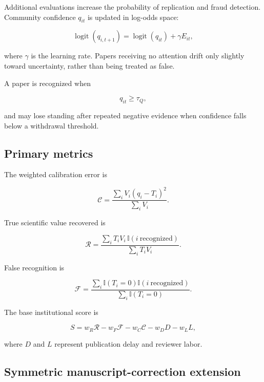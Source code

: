 Additional evaluations increase the probability of replication and fraud detection. Community confidence $q_{it}$ is updated in log-odds space:

\begin{equation}
\operatorname{logit}(q_{i,t+1})
=
\operatorname{logit}(q_{it})+\gamma E_{it},
\end{equation}

where $\gamma$ is the learning rate. Papers receiving no attention drift only slightly toward uncertainty, rather than being treated as false.

A paper is recognized when

\begin{equation}
q_{it}\geq \tau_Q,
\end{equation}

and may lose standing after repeated negative evidence when confidence falls below a withdrawal threshold.

\subsection{Primary metrics}

The weighted calibration error is

\begin{equation}
\mathcal{C}
=
\frac{\sum_i V_i(q_i-T_i)^2}{\sum_i V_i}.
\end{equation}

True scientific value recovered is

\begin{equation}
\mathcal{R}
=
\frac{\sum_i T_iV_i\,\mathbb{I}(i\ \mathrm{recognized})}
{\sum_i T_iV_i}.
\end{equation}

False recognition is

\begin{equation}
\mathcal{F}
=
\frac{\sum_i \mathbb{I}(T_i=0)\mathbb{I}(i\ \mathrm{recognized})}
{\sum_i \mathbb{I}(T_i=0)}.
\end{equation}

The base institutional score is

\begin{equation}
S
=w_R\mathcal{R}
-w_F\mathcal{F}
-w_C\mathcal{C}
-w_D D
-w_L L,
\end{equation}

where $D$ and $L$ represent publication delay and reviewer labor.

\subsection{Symmetric manuscript-correction extension}

